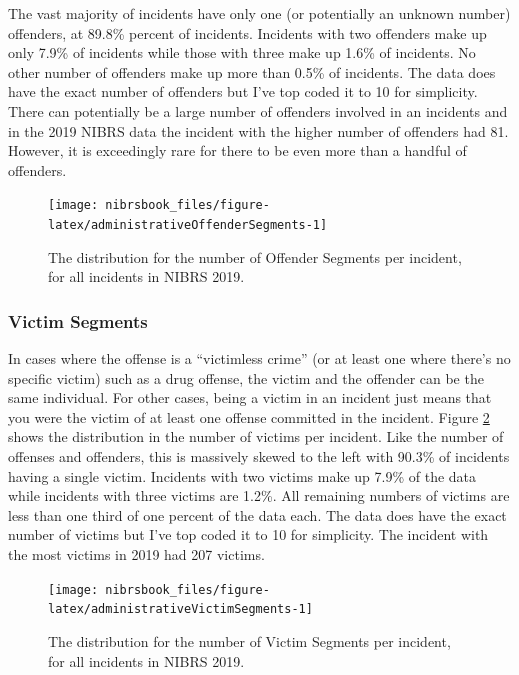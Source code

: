 \documentclass[
  12pt,
  openany]{book}
\begin{document}
The vast majority of incidents have only one (or potentially an unknown number) offenders, at 89.8\% percent of incidents. Incidents with two offenders make up only 7.9\% of incidents while those with three make up 1.6\% of incidents. No other number of offenders make up more than 0.5\% of incidents. The data does have the exact number of offenders but I've top coded it to 10 for simplicity. There can potentially be a large number of offenders involved in an incidents and in the 2019 NIBRS data the incident with the higher number of offenders had 81. However, it is exceedingly rare for there to be even more than a handful of offenders.

\begin{figure}

{\centering \texttt{[image: nibrsbook\_files/figure-latex/administrativeOffenderSegments-1]} 

}

\caption{The distribution for the number of Offender Segments per incident, for all incidents in NIBRS 2019.}\label{fig:administrativeOffenderSegments}
\end{figure}

\hypertarget{victim-segments}{%
\subsubsection{Victim Segments}\label{victim-segments}}

In cases where the offense is a ``victimless crime'' (or at least one where there's no specific victim) such as a drug offense, the victim and the offender can be the same individual. For other cases, being a victim in an incident just means that you were the victim of at least one offense committed in the incident. Figure \ref{fig:administrativeVictimSegments} shows the distribution in the number of victims per incident. Like the number of offenses and offenders, this is massively skewed to the left with 90.3\% of incidents having a single victim. Incidents with two victims make up 7.9\% of the data while incidents with three victims are 1.2\%. All remaining numbers of victims are less than one third of one percent of the data each. The data does have the exact number of victims but I've top coded it to 10 for simplicity. The incident with the most victims in 2019 had 207 victims.

\begin{figure}

{\centering \texttt{[image: nibrsbook\_files/figure-latex/administrativeVictimSegments-1]} 

}

\caption{The distribution for the number of Victim Segments per incident, for all incidents in NIBRS 2019.}\label{fig:administrativeVictimSegments}
\end{figure}
\end{document}
